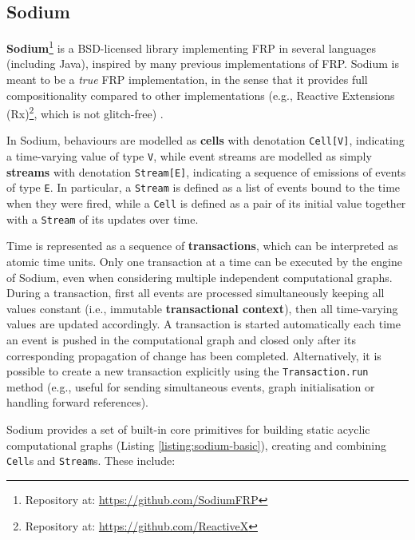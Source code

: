 
\subsection{Sodium}
\label{section:background:technologies:sodium}

\textbf{Sodium}\footnote{Repository at: \url{https://github.com/SodiumFRP}} is a
BSD-licensed library implementing \ac{FRP} in several languages (including
Java), inspired by many previous implementations of \ac{FRP}. Sodium
is meant to be a \textit{true} \ac{FRP} implementation, in the sense that it
provides full compositionality compared to other implementations (e.g., Reactive
Extensions (Rx)\footnote{Repository at: \url{https://github.com/ReactiveX}}, which is not
glitch-free) \cite{FRP}.

In Sodium, behaviours are modelled as \textbf{cells} with denotation
\texttt{Cell[V]}, indicating a time-varying value of type \texttt{V}, while
event streams are modelled as simply \textbf{streams} with denotation
\texttt{Stream[E]}, indicating a sequence of emissions of events of type
\texttt{E}. In particular, a \texttt{Stream} is defined as a list of events
bound to the time when they were fired, while a \texttt{Cell} is defined as a
pair of its initial value together with a \texttt{Stream} of its updates over
time.

Time is represented as a sequence of \textbf{transactions}, which can be
interpreted as atomic time units. Only one transaction at a time can be
executed by the engine of Sodium, even when considering multiple independent
computational graphs. During a transaction, first all events are processed
simultaneously keeping all values constant (i.e., immutable
\textbf{transactional context}), then all time-varying values are updated
accordingly. A transaction is started automatically each time an event is
pushed in the computational graph and closed only after its corresponding
propagation of change has been completed. Alternatively, it is possible to
create a new transaction explicitly using the \texttt{Transaction.run} method
(e.g., useful for sending simultaneous events, graph initialisation or handling
forward references).

Sodium provides a set of built-in core primitives for building static acyclic
computational graphs (Listing \ref{listing:sodium-basic}), creating and
combining \texttt{Cell}s and \texttt{Stream}s. These include:

